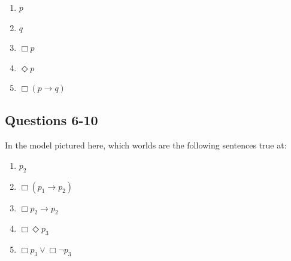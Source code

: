 \documentclass[
  11pt,
  twocolumn]{article}
\providecommand{\tightlist}{%
  \setlength{\itemsep}{0pt}\setlength{\parskip}{0pt}}
\begin{document}
\begin{enumerate}
\def\labelenumi{\arabic{enumi}.}
\tightlist
\item
  \(p\)
\item
  \(q\)
\item
  \(\Box p\)
\item
  \(\Diamond p\)
\item
  \(\Box (p \rightarrow q)\)
\end{enumerate}

\vspace{75pt}

\hypertarget{questions-6-10}{%
\subsection{Questions 6-10}\label{questions-6-10}}

In the model pictured here, which worlds are the following sentences
true at:

\begin{enumerate}
\def\labelenumi{\arabic{enumi}.}
\setcounter{enumi}{5}
\tightlist
\item
  \(p_2\)
\item
  \(\Box(p_1 \rightarrow p_2)\)
\item
  \(\Box p_2 \rightarrow p_2\)
\item
  \(\Box \Diamond p_3\)
\item
  \(\Box p_3 \vee \Box \neg p_3\)
\end{enumerate}
\end{document}
